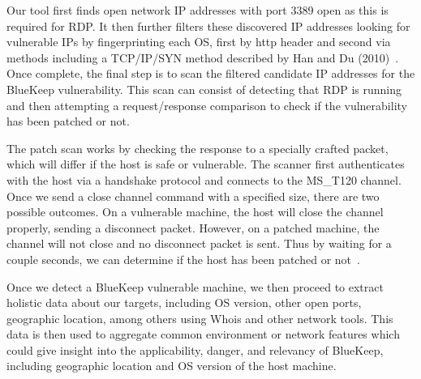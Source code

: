 Our tool first finds open network IP addresses with port 3389 open as this is required for RDP. It then further filters these discovered IP addresses looking for vulnerable IPs by fingerprinting each OS, first by http header and second via methods including a TCP/IP/SYN method described by Han and Du (2010)~\cite{han_du_2010}. Once complete, the final step is to scan the filtered candidate IP addresses for the BlueKeep vulnerability. This scan can consist of detecting that RDP is running and then attempting a request/response comparison to check if the vulnerability has been patched or not.

The patch scan works by checking the response to a specially crafted packet, which will differ if the host is safe or vulnerable. The scanner first authenticates with the host via a handshake protocol and connects to the MS\_T120 channel. Once we send a close channel command with a specified size, there are two possible outcomes. On a vulnerable machine, the host will close the channel properly, sending a disconnect packet. However, on a patched machine, the channel will not close and no disconnect packet is sent. Thus by waiting for a couple seconds, we can determine if the host has been patched or not~\cite{dillon_2019}.

Once we detect a BlueKeep vulnerable machine, we then proceed to extract holistic data about our targets, including OS version, other open ports, geographic location, among others using Whois and other network tools. This data is then used to aggregate common environment or network features which could give insight into the applicability, danger, and relevancy of BlueKeep, including geographic location and OS version of the host machine.